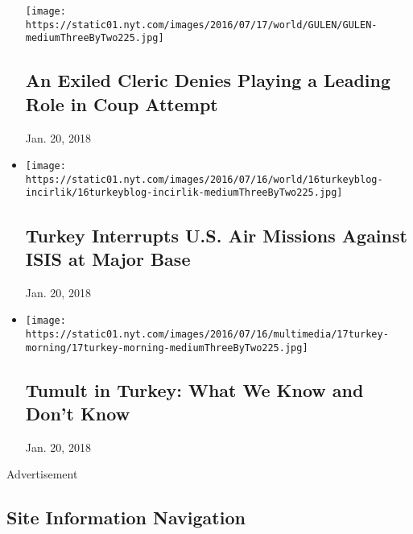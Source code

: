 \begin{itemize}
  \texttt{[image: https://static01.nyt.com/images/2016/07/17/world/GULEN/GULEN-mediumThreeByTwo225.jpg]}

  \hypertarget{an-exiled-cleric-denies-playing-a-leading-role-in-coup-attempt}{%
  \subsection{An Exiled Cleric Denies Playing a Leading Role in Coup
  Attempt}\label{an-exiled-cleric-denies-playing-a-leading-role-in-coup-attempt}}

  Jan. 20, 2018
\item
  \href{https://www.nytimes.com/2016/07/17/world/europe/turkey-us-incirlik-isis.html}{}

  \texttt{[image: https://static01.nyt.com/images/2016/07/16/world/16turkeyblog-incirlik/16turkeyblog-incirlik-mediumThreeByTwo225.jpg]}

  \hypertarget{turkey-interrupts-us-air-missions-against-isis-at-major-base}{%
  \subsection{Turkey Interrupts U.S. Air Missions Against ISIS at Major
  Base}\label{turkey-interrupts-us-air-missions-against-isis-at-major-base}}

  Jan. 20, 2018
\item
  \href{https://www.nytimes.com/2016/07/17/world/europe/tumult-in-turkey-what-we-know-and-what-we-dont-know.html}{}

  \texttt{[image: https://static01.nyt.com/images/2016/07/16/multimedia/17turkey-morning/17turkey-morning-mediumThreeByTwo225.jpg]}

  \hypertarget{tumult-in-turkey-what-we-know-and-dont-know}{%
  \subsection{Tumult in Turkey: What We Know and Don't
  Know}\label{tumult-in-turkey-what-we-know-and-dont-know}}

  Jan. 20, 2018
\end{itemize}

Advertisement

\hypertarget{site-information-navigation}{%
\subsection{Site Information
Navigation}\label{site-information-navigation}}

